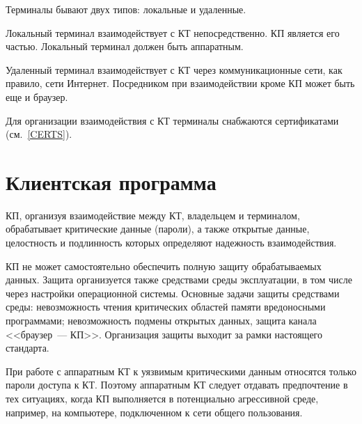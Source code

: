 Терминалы бывают двух типов: локальные и удаленные.

Локальный терминал взаимодействует с КТ непосредственно. КП является 
его частью. Локальный терминал должен быть аппаратным.

Удаленный терминал взаимодействует с КТ через коммуникационные сети,
как правило, сети Интернет. Посредником при взаимодействии 
кроме КП может быть еще и браузер. 

Для организации взаимодействия с КТ терминалы снабжаются сертификатами
(см.~\ref{CERTS}).

\section{Клиентская программа}

КП, организуя взаимодействие между КТ, владельцем и терминалом,
обрабатывает критические данные (пароли), а также открытые данные, 
целостность и подлинность которых определяют надежность  
взаимодействия.

КП не может самостоятельно 
обеспечить полную защиту обрабатываемых данных. 
Защита организуется также средствами среды эксплуатации, 
в том числе через настройки операционной системы.  
%
Основные задачи защиты средствами среды: 
невозможность чтения критических областей памяти вредоносными программами; 
невозможность подмены открытых данных,
защита канала <<браузер~--- КП>>.
%
Организация защиты выходит за рамки настоящего стандарта.

При работе с аппаратным КТ к уязвимым критическими данным
относятся только пароли доступа к КТ. Поэтому аппаратным КТ следует отдавать 
предпочтение в тех ситуациях, когда КП выполняется в потенциально агрессивной 
среде, например, на компьютере, подключенном к сети общего пользования.






